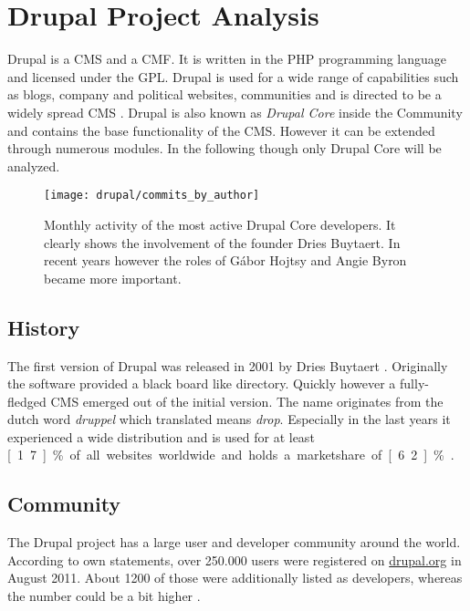 \section{Drupal Project Analysis} %


Drupal is a \ac{CMS} and a \ac{CMF}. It is written in the PHP programming
language and licensed under the \ac{GPL}. Drupal is used for a wide range of
capabilities such as blogs, company and political websites, communities and is
directed to be a widely spread \ac{CMS} \cite{DrupalOverview}. Drupal is also
known as \emph{Drupal Core} inside the Community and contains the base
functionality of the \ac{CMS}. However it can be extended through numerous
modules. In the following though only Drupal Core will be analyzed.

\begin{figure}[htbp]
  \centering
  \texttt{[image: drupal/commits\_by\_author]}
  \caption[Commits by Most Active Authors, Drupal]
  {Monthly activity of the most active Drupal Core developers. It clearly shows
    the involvement of the founder Dries Buytaert. In recent years however the
    roles of Gábor Hojtsy and Angie Byron became more important.}
\end{figure}

\subsection{History} %

The first version of Drupal was released in 2001 by Dries Buytaert
\cite{DrupalHistory}. Originally the software provided a black board like
directory. Quickly however a fully-fledged \ac{CMS} emerged out of the initial
version. The name originates from the dutch word \emph{druppel} which
translated means \emph{drop}. Especially in the last years it
experienced a wide distribution and is used for at least \unit[1.7]{\%} of all
websites worldwide and holds a marketshare of \unit[6.2]{\%}
\cite{DrupalBuiltWith,DrupalW3Techs}.


\subsection{Community} %

The Drupal project has a large user and developer community around the world.
According to own statements, over 250.000 users were registered on
\url{drupal.org} in August 2011. About 1200 of those were additionally listed
as developers, whereas the number could be a bit higher \cite{DrupalBuytaert}.

